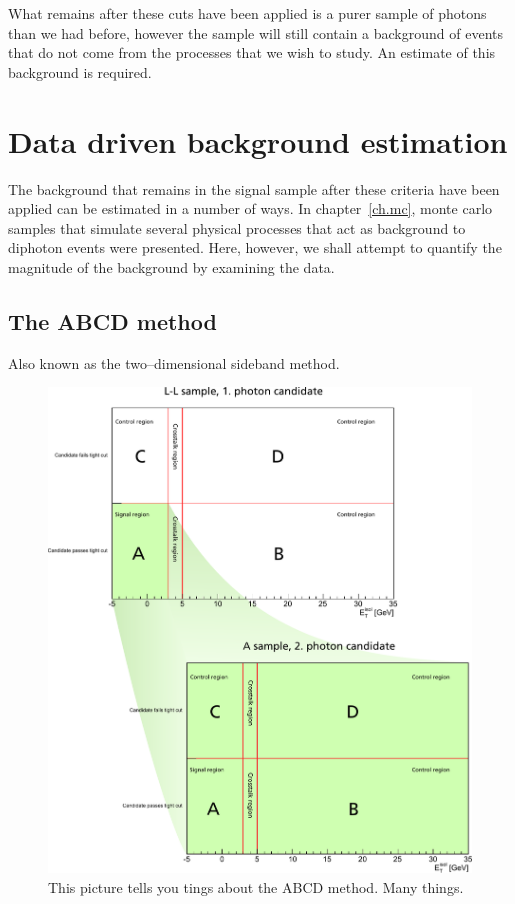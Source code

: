 What remains after these cuts have been applied is a purer sample of photons than we had before, however the sample will still contain a background of events that do not come from the processes that we wish to study. An estimate of this background is required.

\section{Data driven background estimation}
The background that remains in the signal sample after these criteria have been applied can be estimated in a number of ways. In chapter~\ref{ch.mc}, monte  carlo samples that simulate several physical processes that act as background to diphoton events were presented. Here, however, we shall attempt to quantify the magnitude of the background by examining the data.

\subsection{The ABCD method}
Also known as the two--dimensional sideband method.

\begin{figure}[htp]
  \includegraphics[width=\textwidth]{figures/sideband}
  \caption{This picture tells you tings about the ABCD method. Many things.
    \label{abcd}}
\end{figure}

